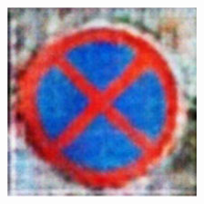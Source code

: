 \begin{figure}[H]
\begin{subfigure}{0.125\textwidth}
    \end{subfigure}
    \hspace{2em}%
    \begin{subfigure}{0.125\textwidth}
     \centering
     \includegraphics[height=\textwidth]{../images/Taiwan Schilder/Generated3.png}
    \end{subfigure}


\end{figure}
